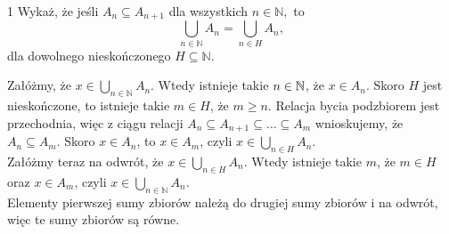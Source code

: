 \documentclass{../note}
\begin{document}
\begin{zadanie}{1}
Wykaż, że jeśli $A_{n}\subseteq A_{n+1}$ dla wszystkich $n\in\mathbb{N},$ to
\[
\bigcup_{n\in\mathbb{N}}A_{n}=\bigcup_{n\in H}A_{n},
\]
dla dowolnego nieskończonego $H\subseteq\mathbb{N}$.
\end{zadanie}
\begin{rozwiazanie}

Załóżmy, że $x \in \bigcup_{n\in\mathbb{N}}A_{n}$. Wtedy istnieje takie $n \in \mathbb{N}$, że $x \in A_n$. Skoro $H$ jest nieskończone, to istnieje takie $m \in H$, że $m \geq n$. Relacja bycia podzbiorem jest przechodnia, więc z ciągu relacji $A_n \subseteq A_{n+1} \subseteq \ldots \subseteq A_m$ wnioskujemy, że $A_n \subseteq A_m$. Skoro $x \in A_n$, to $x \in A_m$, czyli $x \in \bigcup_{n\in H}A_{n}$.\\
Załóżmy teraz na odwrót, że $x \in \bigcup_{n\in H}A_{n}$. Wtedy istnieje takie $m$, że $m \in H$ oraz $x \in A_m$, czyli $x \in \bigcup_{n\in\mathbb{N}}A_{n}$.\\
Elementy pierwszej sumy zbiorów należą do drugiej sumy zbiorów i na odwrót, więc te sumy zbiorów są równe.

\end{rozwiazanie}
\end{document}
